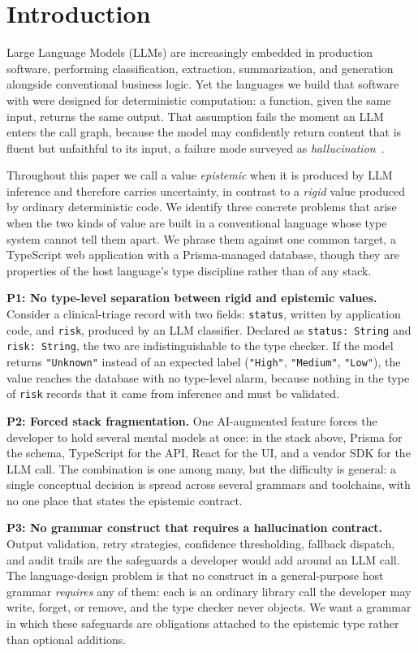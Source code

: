 \documentclass[sigconf]{acmart}
\begin{document}
\section{Introduction}

Large Language Models (LLMs) are increasingly embedded in production software, performing classification, extraction, summarization, and generation alongside conventional business logic. Yet the languages we build that software with were designed for deterministic computation: a function, given the same input, returns the same output. That assumption fails the moment an LLM enters the call graph, because the model may confidently return content that is fluent but unfaithful to its input, a failure mode surveyed as \emph{hallucination}~\cite{ji2023}.

Throughout this paper we call a value \emph{epistemic} when it is produced by LLM inference and therefore carries uncertainty, in contrast to a \emph{rigid} value produced by ordinary deterministic code. We identify three concrete problems that arise when the two kinds of value are built in a conventional language whose type system cannot tell them apart. We phrase them against one common target, a TypeScript web application with a Prisma-managed database, though they are properties of the host language's type discipline rather than of any stack.

\textbf{P1: No type-level separation between rigid and epistemic values.} Consider a clinical-triage record with two fields: \texttt{status}, written by application code, and \texttt{risk}, produced by an LLM classifier. Declared as \texttt{status:~String} and \texttt{risk:~String}, the two are indistinguishable to the type checker. If the model returns \texttt{"Unknown"} instead of an expected label (\texttt{"High"}, \texttt{"Medium"}, \texttt{"Low"}), the value reaches the database with no type-level alarm, because nothing in the type of \texttt{risk} records that it came from inference and must be validated.

\textbf{P2: Forced stack fragmentation.} One AI-augmented feature forces the developer to hold several mental models at once: in the stack above, Prisma for the schema, TypeScript for the API, React for the UI, and a vendor SDK for the LLM call. The combination is one among many, but the difficulty is general: a single conceptual decision is spread across several grammars and toolchains, with no one place that states the epistemic contract.

\textbf{P3: No grammar construct that requires a hallucination contract.} Output validation, retry strategies, confidence thresholding, fallback dispatch, and audit trails are the safeguards a developer would add around an LLM call. The language-design problem is that no construct in a general-purpose host grammar \emph{requires} any of them: each is an ordinary library call the developer may write, forget, or remove, and the type checker never objects. We want a grammar in which these safeguards are obligations attached to the epistemic type rather than optional additions.
\end{document}
